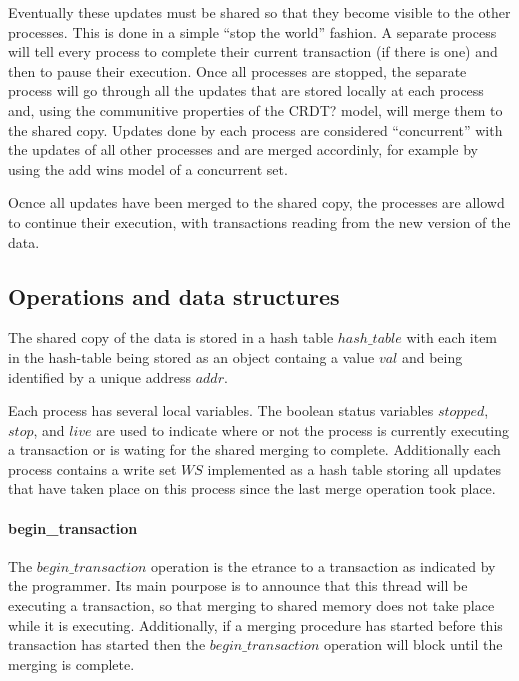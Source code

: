 \documentclass[11pt,letterpaper]{article}
\begin{document}
Eventually these updates must be shared so that they become visible to the other processes.
This is done in a simple ``stop the world'' fashion.
A separate process will tell every process to complete their current transaction (if there is one) and then to pause
their execution.
Once all processes are stopped, the separate process will go through all the updates that are stored locally at
each process and, using the communitive properties of the CRDT? model, will merge them to the shared copy.
Updates done by each process are considered ``concurrent'' with the updates of all other processes and are merged
accordinly, for example by using the add wins model of a concurrent set.

Ocnce all updates have been merged to the shared copy, the processes are allowd to continue their execution,
with transactions reading from the new version of the data.


\subsection{Operations and data structures}

The shared copy of the data is stored in a hash table
$\mathit{hash\_table}$ with each item in the hash-table
being stored as an object
containg a value $\mathit{val}$ and
being identified by a unique address $\mathit{addr}$.

Each process has several local variables.
The boolean status variables $\mathit{stopped}$,
$\mathit{stop}$, and $\mathit{live}$ are used to indicate
where or not the process is currently executing a transaction
or is wating for the shared merging to complete.
Additionally each process contains a write set $\mathit{WS}$
implemented as a hash table
storing all updates that have taken place on this process
since the last merge operation took place.

\paragraph{begin\_transaction}
The $\mathit{begin\_transaction}$ operation is the etrance to
a transaction as indicated by the programmer.
Its main pourpose is to announce that this thread will be executing
a transaction, so that merging to shared memory does not take place
while it is executing.
Additionally, if a merging procedure has started before this transaction
has started then the $\mathit{begin\_transaction}$ operation will
block until the merging is complete.
\end{document}
